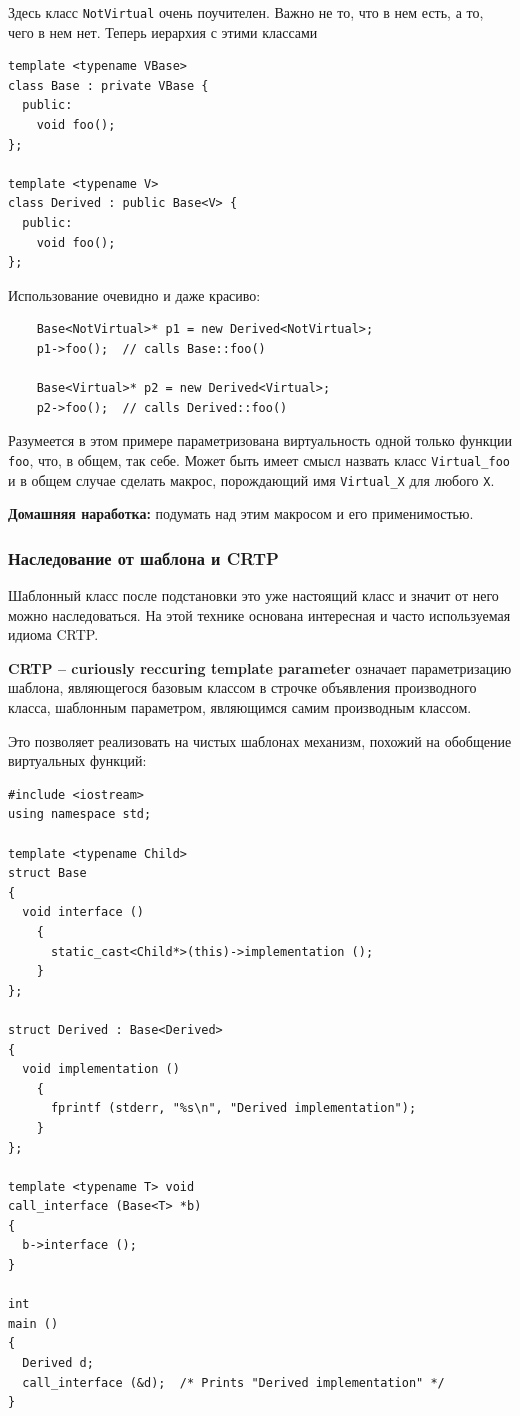 \documentclass[a4paper,12pt,oneside]{article}
\begin{document}
Здесь класс \lstinline!NotVirtual! очень поучителен. Важно не то, что в нем есть, а то, чего в нем нет. Теперь иерархия с этими классами

\begin{lstlisting}
template <typename VBase> 
class Base : private VBase { 
  public: 
    void foo();
}; 

template <typename V> 
class Derived : public Base<V> { 
  public: 
    void foo();
}; 
\end{lstlisting}

Использование очевидно и даже красиво:

\begin{lstlisting}
    Base<NotVirtual>* p1 = new Derived<NotVirtual>; 
    p1->foo();  // calls Base::foo() 

    Base<Virtual>* p2 = new Derived<Virtual>; 
    p2->foo();  // calls Derived::foo() 
\end{lstlisting}

Разумеется в этом примере параметризована виртуальность одной только функции \lstinline!foo!, что, в общем, так себе. Может быть имеет смысл назвать класс \lstinline!Virtual_foo! и в общем случае сделать макрос, порождающий имя \lstinline!Virtual_X! для любого \lstinline!X!.

\textbf{Домашняя наработка:} подумать над этим макросом и его применимостью.

\subsubsection{Наследование от шаблона и CRTP}\label{CRTP}

Шаблонный класс после подстановки это уже настоящий класс и значит от него можно наследоваться. На этой технике основана интересная и часто используемая идиома CRTP.

\textbf{CRTP – curiously reccuring template parameter} означает параметризацию шаблона, являющегося базовым классом в строчке объявления производного класса, шаблонным параметром, являющимся самим производным классом. 

Это позволяет реализовать на чистых шаблонах механизм, похожий на обобщение виртуальных функций:

\begin{lstlisting}
#include <iostream>
using namespace std;

template <typename Child>
struct Base
{
  void interface ()
    {
      static_cast<Child*>(this)->implementation ();
    }
};

struct Derived : Base<Derived>
{
  void implementation ()
    {
      fprintf (stderr, "%s\n", "Derived implementation");
    }
};

template <typename T> void
call_interface (Base<T> *b)
{
  b->interface ();
}

int 
main ()
{
  Derived d;
  call_interface (&d);  /* Prints "Derived implementation" */
}
\end{lstlisting}
\end{document}
